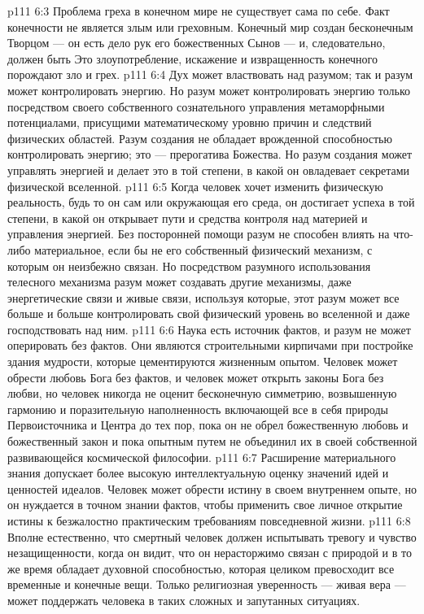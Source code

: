 \vs p111 6:3 \pc Проблема греха в конечном мире не существует сама по себе. Факт конечности не является злым или греховным. Конечный мир создан бесконечным Творцом --- он есть дело рук его божественных Сынов --- и, следовательно, должен быть  Это злоупотребление, искажение и извращенность конечного порождают зло и грех.
\vs p111 6:4 \pc Дух может властвовать над разумом; так и разум может контролировать энергию. Но разум может контролировать энергию только посредством своего собственного сознательного управления метаморфными потенциалами, присущими математическому уровню причин и следствий физических областей. Разум создания не обладает врожденной способностью контролировать энергию; это --- прерогатива Божества. Но разум создания может управлять энергией и делает это в той степени, в какой он овладевает секретами физической вселенной.
\vs p111 6:5 Когда человек хочет изменить физическую реальность, будь то он сам или окружающая его среда, он достигает успеха в той степени, в какой он открывает пути и средства контроля над материей и управления энергией. Без посторонней помощи разум не способен влиять на что\hyp{}либо материальное, если бы не его собственный физический механизм, с которым он неизбежно связан. Но посредством разумного использования телесного механизма разум может создавать другие механизмы, даже энергетические связи и живые связи, используя которые, этот разум может все больше и больше контролировать свой физический уровень во вселенной и даже господствовать над ним.
\vs p111 6:6 Наука есть источник фактов, и разум не может оперировать без фактов. Они являются строительными кирпичами при постройке здания мудрости, которые цементируются жизненным опытом. Человек может обрести любовь Бога без фактов, и человек может открыть законы Бога без любви, но человек никогда не оценит бесконечную симметрию, возвышенную гармонию и поразительную наполненность включающей все в себя природы Первоисточника и Центра до тех пор, пока он не обрел божественную любовь и божественный закон и пока опытным путем не объединил их в своей собственной развивающейся космической философии.
\vs p111 6:7 Расширение материального знания допускает более высокую интеллектуальную оценку значений идей и ценностей идеалов. Человек может обрести истину в своем внутреннем опыте, но он нуждается в точном знании фактов, чтобы применить свое личное открытие истины к безжалостно практическим требованиям повседневной жизни.
\vs p111 6:8 \pc Вполне естественно, что смертный человек должен испытывать тревогу и чувство незащищенности, когда он видит, что он нерасторжимо связан с природой и в то же время обладает духовной способностью, которая целиком превосходит все временные и конечные вещи. Только религиозная уверенность --- живая вера --- может поддержать человека в таких сложных и запутанных ситуациях.
